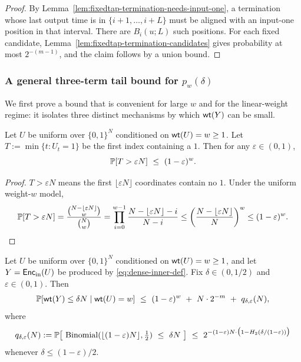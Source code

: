 \begin{proof}
By Lemma~\ref{lem:fixedtap-termination-needs-input-one}, a termination whose last output time is in
\(\{i+1,\dots,i+L\}\) must be aligned with an input-one position in that interval. There are \(B_i(u;L)\) such
positions. For each fixed candidate, Lemma~\ref{lem:fixedtap-termination-candidates} gives probability at most
\(2^{-(m-1)}\), and the claim follows by a union bound.
\end{proof}

\subsubsection{A general three-term tail bound for $p_w(\delta)$}
\label{subsec:inner-dense-three-term}

We first prove a bound that is convenient for large $w$ and for the linear-weight regime:
it isolates three distinct mechanisms by which $\mathsf{wt}(Y)$ can be small.

\begin{lemma}
\label{lem:first-one-early}
Let $U$ be uniform over $\{0,1\}^N$ conditioned on $\mathsf{wt}(U)=w\ge 1$.
Let $T:=\min\{t:U_t=1\}$ be the first index containing a $1$.
Then for any $\varepsilon\in(0,1)$,
\[
\PP[T>\varepsilon N]\ \le\ (1-\varepsilon)^w.
\]
\end{lemma}

\begin{proof}
$T>\varepsilon N$ means the first $\lfloor \varepsilon N\rfloor$ coordinates contain no $1$.
Under the uniform weight-$w$ model,
\[
\mathbb{P}[T>\varepsilon N]
=
\frac{\binom{N-\lfloor\varepsilon N\rfloor}{w}}{\binom{N}{w}}
=
\prod_{i=0}^{w-1}\frac{N-\lfloor\varepsilon N\rfloor-i}{N-i}
\le
\left(\frac{N-\lfloor\varepsilon N\rfloor}{N}\right)^w
\le
(1-\varepsilon)^w.
\]
\end{proof}

\begin{lemma}
\label{lem:dense-three-term-tail}
Let $U$ be uniform over $\{0,1\}^N$ conditioned on $\mathsf{wt}(U)=w\ge 1$, and let $Y=\mathsf{Enc}_{\mathrm{in}}(U)$ be produced by
\eqref{eq:dense-inner-def}. Fix $\delta\in(0,1/2)$ and $\varepsilon\in(0,1)$. Then
\begin{equation}
\label{eq:dense-three-term}
\PP[\wt(Y)\le \delta N \mid \wt(U)=w]
\ \le\
(1-\varepsilon)^w\ +\ N\cdot 2^{-m}\ +\ q_{\delta,\varepsilon}(N),
\end{equation}
where
\[
q_{\delta,\varepsilon}(N)
:=
\PP\!\left[\ \mathrm{Binomial}(\lfloor(1-\varepsilon)N\rfloor,\tfrac12)\ \le\ \delta N\ \right]
\ \le\
2^{-(1-\varepsilon)N\cdot \big(1-H_2(\delta/(1-\varepsilon))\big)}
\]
whenever $\delta\le (1-\varepsilon)/2$.
\end{lemma}

